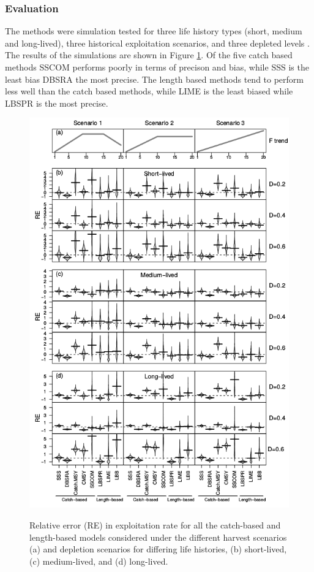 \subsubsection*{Evaluation}

The methods were simulation tested for three life history types (short, medium and long-lived), three historical exploitation scenarios, and three depleted levels \citep{pons2019catchlen}. The results of the simulations are shown in Figure \ref{fig:cln}. Of the five catch based methods SSCOM performs poorly in terms of precison and bias, while SSS is the least bias DBSRA the most precise. The length based methods tend to perform less well than the catch based methods, while LIME is the least biased while LBSPR is the most precise.

\begin{figure}[h!]\centering\includegraphics[width=6in]{figs/Figure_1.png}\label{fig:cln}\caption{Relative error (RE) in exploitation rate for all the catch-based and length-based models considered under the different harvest scenarios (a) and depletion scenarios for differing life histories, (b) short-lived, (c) medium-lived, and (d) long-lived.}
\end{figure}

